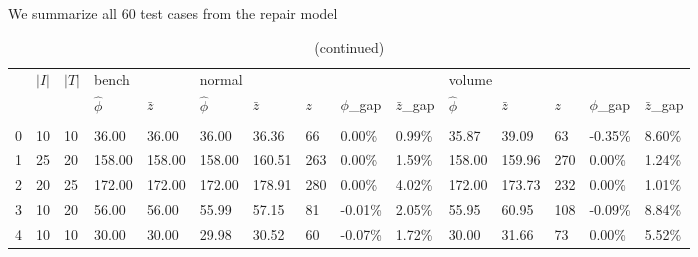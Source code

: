 \documentclass[
  a4paper,
,tablecaptionabove
]{scrartcl}
\numberwithin{equation}{section}
\begin{document}
We summarize all \(60\) test cases from the repair model

\scriptsize
\setlength{\tabcolsep}{6pt}
\begin{longtable}{l|ll|ll|lllll|lllll}
  \caption[Computational results]{Computational results from the repair model
  \label{tab:comp_repair_cases}}                                                                                                                                                                       \\
  \toprule
  {} & \multirow{2}{*}{$|I|$}     & \multirow{2}{*}{$|T|$}     & \multicolumn{2}{h}{bench}
     & \multicolumn{5}{h}{normal} & \multicolumn{5}{h}{volume}                                                                                                                                         \\
  {} & {}                         & {}                         & $\hat \phi$               & $\bar z$
     & $\hat \phi$                & $\bar z$                   & $z$                       & $\phi$\_gap & $\bar z$\_gap
     & $\hat \phi$                & $\bar z$                   & $z$                       & $\phi$\_gap & $\bar z$\_gap                                                                               \\
  \endfirsthead
  \caption[]{(continued)}                                                                                                                                                                              \\
  \endhead
  \midrule
  0  & 10                         & 10                         & 36.00                     & 36.00       & 36.00         & 36.36  & 66  & 0.00\%  & 0.99\% & 35.87  & 39.09  & 63  & -0.35\% & 8.60\%  \\
  1  & 25                         & 20                         & 158.00                    & 158.00      & 158.00        & 160.51 & 263 & 0.00\%  & 1.59\% & 158.00 & 159.96 & 270 & 0.00\%  & 1.24\%  \\
  2  & 20                         & 25                         & 172.00                    & 172.00      & 172.00        & 178.91 & 280 & 0.00\%  & 4.02\% & 172.00 & 173.73 & 232 & 0.00\%  & 1.01\%  \\
  3  & 10                         & 20                         & 56.00                     & 56.00       & 55.99         & 57.15  & 81  & -0.01\% & 2.05\% & 55.95  & 60.95  & 108 & -0.09\% & 8.84\%  \\
  4  & 10                         & 10                         & 30.00                     & 30.00       & 29.98         & 30.52  & 60  & -0.07\% & 1.72\% & 30.00  & 31.66  & 73  & 0.00\%  & 5.52\%  \\

\end{longtable}
\end{document}
